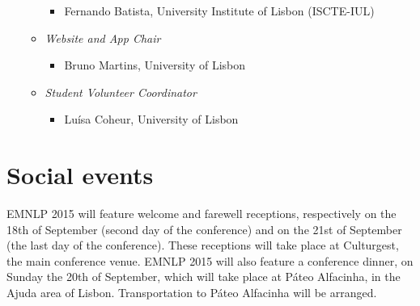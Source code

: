 \begin{itemize}[itemsep=7pt, leftmargin=0cm, label={}]
\begin{itemize}[itemsep=6pt, leftmargin=0.2cm, label={}]
\begin{itemize}[nosep, leftmargin=0.5cm, label={}]
\item Fernando Batista, University Institute of Lisbon (ISCTE-IUL) 
\end{itemize}
\item \textit{Website and App Chair} 

\begin{itemize}[nosep, leftmargin=0.5cm, label={}]
\item Bruno Martins, University of Lisbon 
\end{itemize}
\item \emph{Student Volunteer Coordinator}

\begin{itemize}[nosep, leftmargin=0.5cm, label={}]
\item Luísa Coheur, University of Lisbon
\end{itemize}
\end{itemize}
\end{itemize}
\clearpage{}


\section{Social events}

\noindent EMNLP 2015 will feature welcome and farewell receptions,
respectively on the 18th of September (second day of the conference)
and on the 21st of September (the last day of the conference). These
receptions will take place at Culturgest, the main conference venue.
EMNLP 2015 will also feature a conference dinner, on Sunday the 20th
of September, which will take place at Páteo Alfacinha, in the Ajuda
area of Lisbon. Transportation to Páteo Alfacinha will be arranged.

